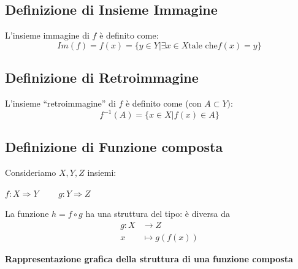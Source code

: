 \documentclass{article}
\theoremstyle{definition}
\newcommand{\virgolette}[1]{``#1''}
\begin{document}
\subsection{Definizione di Insieme Immagine}
L'insieme immagine di $f$ è definito come:
\begin{equation}
    Im(f)=f(x)=\{y \in Y | \exists x \in X \mbox{tale che} f(x)=y\}
\end{equation}

\subsection{Definizione di Retroimmagine}
L'insieme \virgolette{retroimmagine} di $f$ è definito come (con $A \subset Y)$:
\begin{equation}
    f^{-1}(A)=\{x \in X | f(x) \in A\}
\end{equation}

\newpage
\subsection{Definizione di Funzione composta}
Consideriamo $X,Y,Z$ insiemi:
\\
\begin{center}
    $f: X \Rightarrow Y \,\,\,\,\,\,\,\,\,\,\,\,\,\, g: Y \Rightarrow Z$
\end{center}
La funzione $h=f \circ g$ ha una struttura del tipo:
 è diversa da \begin{align*}
g \colon X &\to Z \\
x &\mapsto g(f(x))
\end{align*}

\begin{center}
    \textbf{Rappresentazione grafica della struttura di una funzione composta}

    \vspace{1cm} %

\end{center}
\end{document}
